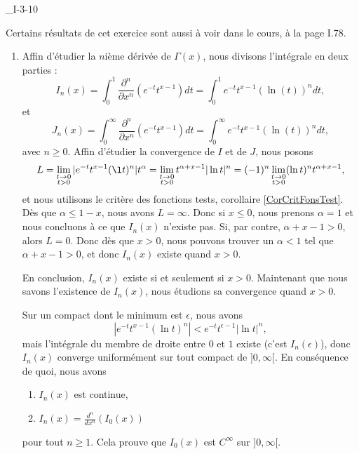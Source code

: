 

\begin{corrige}{_I-3-10}

Certains résultats de cet exercice sont aussi à voir dans le cours, à la page I.78.

\begin{enumerate}
\item 

Affin d'étudier la $n$ième dérivée de $\Gamma(x)$, nous divisons l'intégrale en deux parties :
\begin{equation}
	I_n(x)=\int_0^1\frac{ \partial^n }{ \partial x^n }\left(  e^{-t}t^{x-1} \right)dt=\int_0^1 e^{-t} t^{x-1} (\ln(t))^n dt,
\end{equation}
et 
\begin{equation}
	J_n(x)=\int_0^{\infty}\frac{ \partial^n }{ \partial x^n }\left(  e^{-t}t^{x-1} \right)dt=\int_0^{\infty} e^{-t} t^{x-1} (\ln(t))^n dt,
\end{equation}
avec $n\geq 0$. Affin d'étudier la convergence de $I$ et de $J$, nous posons
\begin{equation}
	L=\lim_{\substack{t\to 0\\t>0}} |  e^{-t}t^{x-1}(\l t)^n |t^{\alpha}= \lim_{\substack{t\to 0\\t>0}} t^{\alpha+x-1}| \ln t |^n=(-1)^n\lim_{\substack{t\to 0\\t>0}} (\ln t)^nt^{\alpha+x-1},
\end{equation}
et nous utilisons le critère des fonctions tests, corollaire \ref{CorCritFonsTest}. Dès que $\alpha\leq 1-x$, nous avons $L=\infty$. Donc si $x\leq0$, nous prenons $\alpha=1$ et nous concluons à ce que $I_n(x)$ n'existe pas. Si, par contre, $\alpha+x-1>0$, alors $L=0$. Donc dès que $x>0$, nous pouvons trouver un $\alpha<1$ tel que $\alpha+x-1>0$, et donc $I_n(x)$ existe quand $x>0$.

En conclusion, $I_n(x)$ existe si et seulement si $x>0$. Maintenant que nous savons l'existence de $I_n(x)$, nous étudions sa convergence quand $x>0$.

Sur un compact dont le minimum est $\epsilon$, nous avons
\begin{equation}
	|  e^{-t}t^{x-1}(\ln t)^n |< e^{-t}t^{\epsilon-1}| \ln t |^n,
\end{equation}
mais l'intégrale du membre de droite entre $0$ et $1$ existe (c'est $I_n(\epsilon)$), donc $I_n(x)$ converge uniformément sur tout compact de $]0,\infty[$. En conséquence de quoi, nous avons
\begin{enumerate}
\item $I_n(x)$ est continue,
\item $I_n(x)=\frac{ d^n }{ dx^n }\left( I_0(x) \right)$
\end{enumerate}
pour tout $n\geq 1$. Cela prouve que $I_0(x)$ est $ C^{\infty}$ sur $]0,\infty[$.


\end{enumerate}
\end{corrige}
